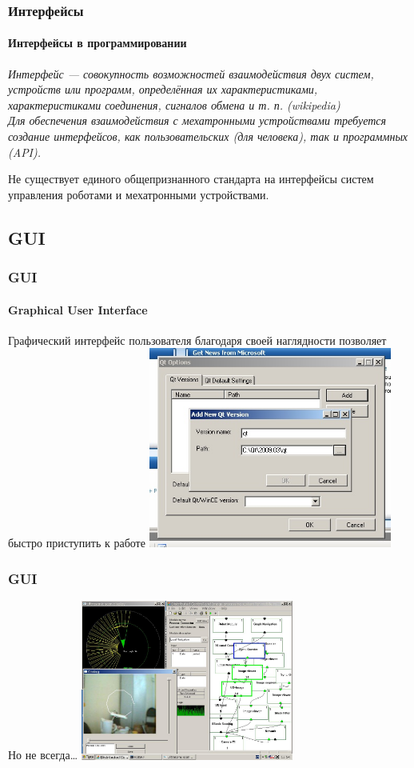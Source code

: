 \documentclass{beamer}
\begin{document}
\begin{frame}
\frametitle{Интерфейсы}
\framesubtitle{Интерфейсы в программировании}

\em{Интерфейс} — совокупность возможностей взаимодействия двух систем,
устройств или программ, определённая их характеристиками, характеристиками соединения, сигналов обмена и т. п.
(wikipedia)
\\

Для обеспечения взаимодействия с мехатронными устройствами требуется
создание интерфейсов, как пользовательских (для человека), так и программных (API).

Не существует единого общепризнанного стандарта на интерфейсы систем
управления роботами и мехатронными устройствами.
\end{frame}


\subsection{GUI}
\begin{frame}
\frametitle{GUI}
\framesubtitle{Graphical User Interface}
Графический интерфейс пользователя благодаря своей наглядности позволяет быстро приступить к работе
\includegraphics[width=8cm]{button.jpg}
\end{frame}

\begin{frame}
\frametitle{GUI}
Но не всегда\ldots
\includegraphics[width=7cm]{hell.jpg}
\end{frame}
\end{document}
